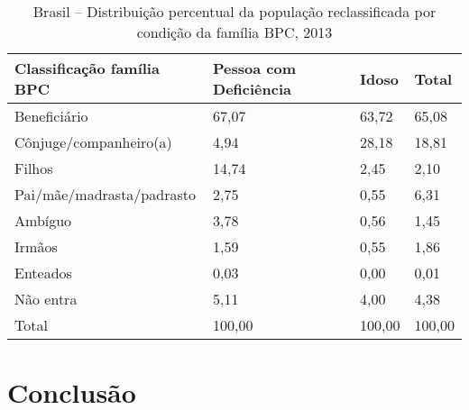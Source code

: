 \documentclass[
	12pt,				%
	openright,			%
	twoside,			%
	a4paper,			%
	english,			%
	french,				%
	spanish,			%
	brazil				%
	]{abntex2}
\begin{document}
\begin{table}[h]
	\footnotesize
	\centering
	\caption{Brasil -- Distribuição percentual da população reclassificada por condição da família BPC, 2013}
	\label{tab_reclass_cond}
	\begin{tabular}{@{}p{4.5cm}p{4cm}p{3cm}p{3cm}@{}}
		\toprule
		\textbf{Classificação família BPC} & \textbf{Pessoa com Deficiência} & \textbf{Idoso} & \textbf{Total} \\ \midrule
		Beneficiário                       & 67,07                           & 63,72          & 65,08          \\
		Cônjuge/companheiro(a)             & 4,94                            & 28,18          & 18,81          \\
		Filhos                             & 14,74                           & 2,45           & 2,10           \\
		Pai/mãe/madrasta/padrasto          & 2,75                            & 0,55           & 6,31           \\
		Ambíguo                            & 3,78                            & 0,56           & 1,45           \\
		Irmãos                             & 1,59                            & 0,55           & 1,86           \\
		Enteados                           & 0,03                            & 0,00           & 0,01           \\
		Não entra                          & 5,11                            & 4,00           & 4,38           \\ \midrule
		Total                              & 100,00                          & 100,00         & 100,00         \\ \bottomrule
	\end{tabular}
\end{table}


\chapter{Conclusão}



\postextual


\end{document}
